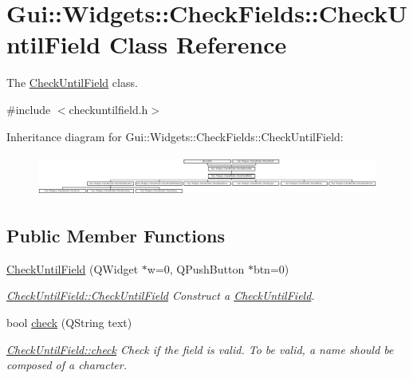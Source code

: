 \hypertarget{classGui_1_1Widgets_1_1CheckFields_1_1CheckUntilField}{}\section{Gui\+:\+:Widgets\+:\+:Check\+Fields\+:\+:Check\+Until\+Field Class Reference}
\label{classGui_1_1Widgets_1_1CheckFields_1_1CheckUntilField}


The \hyperlink{classGui_1_1Widgets_1_1CheckFields_1_1CheckUntilField}{Check\+Until\+Field} class.  




{\ttfamily \#include $<$checkuntilfield.\+h$>$}

Inheritance diagram for Gui\+:\+:Widgets\+:\+:Check\+Fields\+:\+:Check\+Until\+Field\+:\begin{figure}[H]
\begin{center}
\leavevmode
\includegraphics[height=1.374570cm]{d4/d37/classGui_1_1Widgets_1_1CheckFields_1_1CheckUntilField}
\end{center}
\end{figure}
\subsection*{Public Member Functions}
\begin{DoxyCompactItemize}
\item 
\hyperlink{classGui_1_1Widgets_1_1CheckFields_1_1CheckUntilField_a351fcf364f4ca3b2b4da806e6e5cf185}{Check\+Until\+Field} (Q\+Widget $\ast$w=0, Q\+Push\+Button $\ast$btn=0)
\begin{DoxyCompactList}\small\item\em \hyperlink{classGui_1_1Widgets_1_1CheckFields_1_1CheckUntilField_a351fcf364f4ca3b2b4da806e6e5cf185}{Check\+Until\+Field\+::\+Check\+Until\+Field} Construct a \hyperlink{classGui_1_1Widgets_1_1CheckFields_1_1CheckUntilField}{Check\+Until\+Field}. \end{DoxyCompactList}\item 
bool \hyperlink{classGui_1_1Widgets_1_1CheckFields_1_1CheckUntilField_ad8d3923aa32bbcba0d73bb4240fe96e8}{check} (Q\+String text)
\begin{DoxyCompactList}\small\item\em \hyperlink{classGui_1_1Widgets_1_1CheckFields_1_1CheckUntilField_ad8d3923aa32bbcba0d73bb4240fe96e8}{Check\+Until\+Field\+::check} Check if the field is valid. To be valid, a name should be composed of a character. \end{DoxyCompactList}\end{DoxyCompactItemize}
